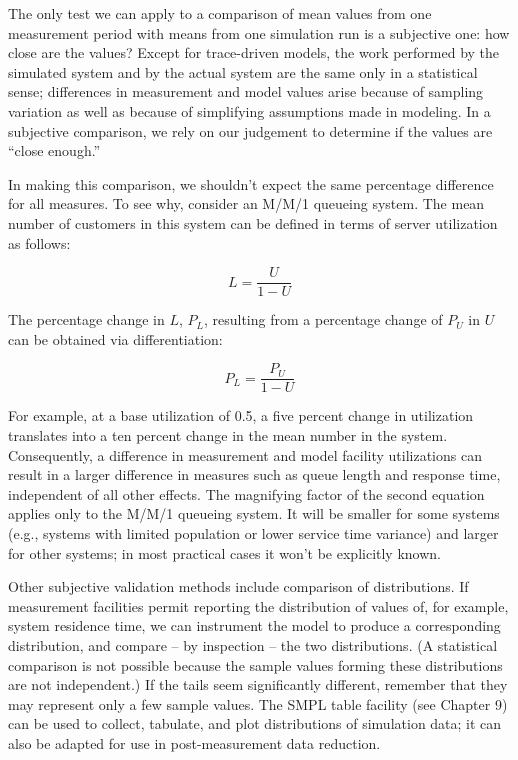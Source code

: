 The only test we can apply to a comparison of mean values from one measurement
period with means from one simulation run is a subjective one: how close are
the values? Except for trace-driven models, the work performed by the
simulated system and by the actual system are the same only in a statistical
sense; differences in measurement and model values arise because of sampling
variation as well as because of simplifying assumptions made in modeling. In a
subjective comparison, we rely on our judgement to determine if the values are
``close enough.''

In making this comparison, we shouldn't expect the same percentage difference
for all measures. To see why, consider an M/M/1 queueing system. The mean
number of customers in this system can be defined in terms of server
utilization as follows:

\begin{equation}
L = \frac{U}{1-U}
\end{equation}

The percentage change in $L$, $P_L$, resulting from a percentage change of
$P_U$ in $U$ can be obtained via differentiation:

\begin{equation}
P_L = \frac{P_U}{1-U}
\end{equation}

For example, at a base utilization of 0.5, a five percent change in
utilization translates into a ten percent change in the mean number in the
system. Consequently, a difference in measurement and model facility
utilizations can result in a larger difference in measures such as queue
length and response time, independent of all other effects. The magnifying
factor of the second equation applies only to the M/M/1 queueing system. It
will be smaller for some systems (e.g., systems with limited population or
lower service time variance) and larger for other systems; in most practical
cases it won't be explicitly known.

Other subjective validation methods include comparison of distributions. If
measurement facilities permit reporting the distribution of values of, for
example, system residence time, we can instrument the model to produce a
corresponding distribution, and compare -- by inspection -- the two
distributions. (A statistical comparison is not possible because the sample
values forming these distributions are not independent.) If the tails seem
significantly different, remember that they may represent only a few sample
values. The SMPL table facility (see Chapter 9) can be used to collect,
tabulate, and plot distributions of simulation data; it can also be adapted for
use in post-measurement data reduction.

